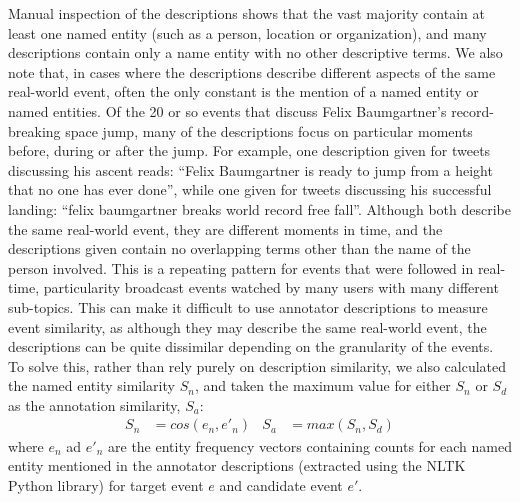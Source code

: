 Manual inspection of the descriptions shows that the vast majority contain at least one named entity (such as a person, location or organization), and many descriptions contain only a name entity with no other descriptive terms.
We also note that, in cases where the descriptions describe different aspects of the same real-world event, often the only constant is the mention of a named entity or named entities.
Of the 20 or so events that discuss Felix Baumgartner's record-breaking space jump, many of the descriptions  focus on particular moments before, during or after the jump. For example, one description given for tweets discussing his ascent reads: ``Felix Baumgartner is ready to jump from a height that no one has ever done'', while one given for tweets discussing his successful landing: ``felix baumgartner breaks world record free fall''.
Although both describe the same real-world event, they are different moments in time, and the descriptions given contain no overlapping terms other than the name of the person involved.
This is a repeating pattern for events that were followed in real-time, particularity broadcast events watched by many users with many different sub-topics.
This can make it difficult to use annotator descriptions to measure event similarity, as although they may describe the same real-world event, the descriptions can be quite dissimilar depending on the granularity of the events.
To solve this, rather than rely purely on description similarity, we also calculated the named entity similarity $S_n$, and taken the maximum value for either $S_n$ or $S_d$ as the annotation similarity, $S_a$:
\begin{align*}
	S_n &= cos(e_n, e'_n) & S_a &= max(S_n, S_d)
\end{align*}
where $e_n$ ad $e'_n$ are the entity frequency vectors containing counts for each named entity mentioned in the annotator descriptions (extracted using the NLTK Python library) for target event $e$ and candidate event $e'$.

